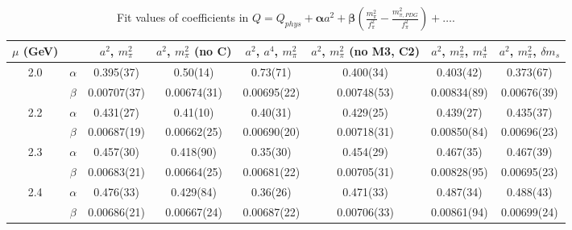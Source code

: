 \documentclass[12pt]{extarticle}
\begin{document}
\begin{table}[h!]
\begin{center}
\begin{tabular}{|c c|c|c|c|c|c|c|}
\hline
$\mu$ (GeV) &  & $a^2$, $m_\pi^2$& $a^2$, $m_\pi^2$ (no C)& $a^2$, $a^4$, $m_\pi^2$& $a^2$, $m_\pi^2$ (no M3, C2)& $a^2$, $m_\pi^2$, $m_\pi^4$& $a^2$, $m_\pi^2$, $\delta m_s$\\
\hline
\multirow{2}{0.5in}{2.0} & $\alpha$ & 0.395(37)& 0.50(14)& 0.73(71)& 0.400(34)& 0.403(42)& 0.373(67)\\
 & $\beta$ & 0.00707(37)& 0.00674(31)& 0.00695(22)& 0.00748(53)& 0.00834(89)& 0.00676(39)\\
\hline
\multirow{2}{0.5in}{2.2} & $\alpha$ & 0.431(27)& 0.41(10)& 0.40(31)& 0.429(25)& 0.439(27)& 0.435(37)\\
 & $\beta$ & 0.00687(19)& 0.00662(25)& 0.00690(20)& 0.00718(31)& 0.00850(84)& 0.00696(23)\\
\hline
\multirow{2}{0.5in}{2.3} & $\alpha$ & 0.457(30)& 0.418(90)& 0.35(30)& 0.454(29)& 0.467(35)& 0.467(39)\\
 & $\beta$ & 0.00683(21)& 0.00664(25)& 0.00681(22)& 0.00705(31)& 0.00828(95)& 0.00695(23)\\
\hline
\multirow{2}{0.5in}{2.4} & $\alpha$ & 0.476(33)& 0.429(84)& 0.36(26)& 0.471(33)& 0.487(34)& 0.488(43)\\
 & $\beta$ & 0.00686(21)& 0.00667(24)& 0.00687(22)& 0.00706(33)& 0.00861(94)& 0.00699(24)\\
\hline
\end{tabular}
\caption{Fit values of coefficients in $Q = Q_{phys} + \mathbf{\alpha} a^2 + \mathbf{\beta}\left(\frac{m_\pi^2}{f_\pi^2}-\frac{m_{\pi,PDG}^2}{f_\pi^2}\right) + \ldots$.}
\end{center}
\end{table}
























\clearpage
\end{document}
